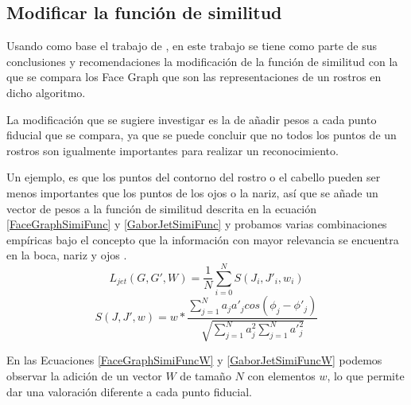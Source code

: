 \subsection{Modificar la función de similitud} 
Usando como base el trabajo de \cite{bolme2003elastic}, en este trabajo se tiene como parte de sus conclusiones y recomendaciones la modificación de la función de similitud con la que se compara los Face Graph que son las representaciones de un rostros en dicho algoritmo.

La modificación que se sugiere investigar es la de añadir pesos a cada punto fiducial que se compara, ya que se puede concluir que no todos los puntos de un rostros son igualmente importantes para realizar un reconocimiento. 

Un ejemplo, es que los puntos del contorno del rostro o el cabello pueden ser menos importantes que los puntos de los ojos o la nariz, así que se añade un vector de pesos a la función de similitud descrita en la ecuación \ref{FaceGraphSimiFunc} y \ref{GaborJetSimiFunc} y probamos varias combinaciones empíricas bajo el concepto que la información con mayor relevancia se encuentra en la boca, nariz y ojos .
\begin{equation}
\label{FaceGraphSimiFuncW}
L_{jet}(G,G',W)=\frac{1}{N}\sum_{i=0}^{N}S(J_{i},J'_{i},w_{i})
\end{equation}
\begin{equation}
\label{GaborJetSimiFuncW}
S(J,J',w)=w*\frac{\sum_{j=1}^{N}a_j a'_jcos(\phi_j-\phi'_j)}{\sqrt{\sum_{j=1}^{N}a_j^2 \sum_{j=1}^{N}{a'}_j^2}}
\end{equation}

En las Ecuaciones \ref{FaceGraphSimiFuncW} y \ref{GaborJetSimiFuncW} podemos observar la adición de un vector $W$ de tamaño $N$ con elementos $w$, lo que permite dar una valoración diferente a cada punto fiducial.

